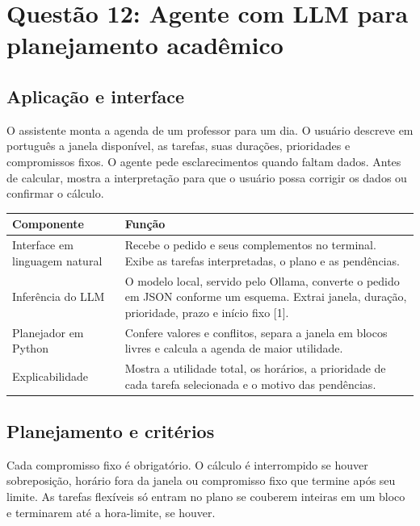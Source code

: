 \documentclass[12pt,a4paper]{article}
\begin{document}
\section{Questão 12: Agente com LLM para planejamento acadêmico}

\subsection{Aplicação e interface}

O assistente monta a agenda de um professor para um dia. O usuário descreve em português a janela disponível, as tarefas, suas durações, prioridades e compromissos fixos. O agente pede esclarecimentos quando faltam dados. Antes de calcular, mostra a interpretação para que o usuário possa corrigir os dados ou confirmar o cálculo.

\begin{table}[htbp]
    \centering
    \begin{tabular}{>{\raggedright\arraybackslash}p{4.5cm} >{\raggedright\arraybackslash}p{10.3cm}}
        \toprule
        \textbf{Componente} & \textbf{Função} \\
        \midrule
        Interface em linguagem natural & Recebe o pedido e seus complementos no terminal. Exibe as tarefas interpretadas, o plano e as pendências. \\
        \addlinespace
        Inferência do LLM & O modelo local, servido pelo Ollama, converte o pedido em JSON conforme um esquema. Extrai janela, duração, prioridade, prazo e início fixo [1]. \\
        \addlinespace
        Planejador em Python & Confere valores e conflitos, separa a janela em blocos livres e calcula a agenda de maior utilidade. \\
        \addlinespace
        Explicabilidade & Mostra a utilidade total, os horários, a prioridade de cada tarefa selecionada e o motivo das pendências. \\
        \bottomrule
    \end{tabular}
\end{table}

\subsection{Planejamento e critérios}

Cada compromisso fixo é obrigatório. O cálculo é interrompido se houver sobreposição, horário fora da janela ou compromisso fixo que termine após seu limite. As tarefas flexíveis só entram no plano se couberem inteiras em um bloco e terminarem até a hora-limite, se houver.
\end{document}
